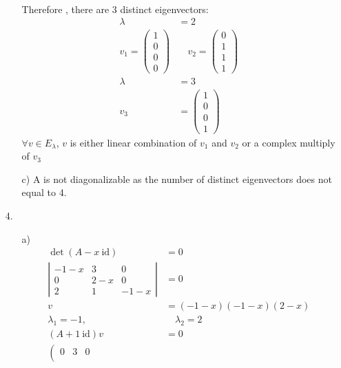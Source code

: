 \documentclass{article}
\begin{document}
\begin{itemize}
\begin{itemize}
\begin{align*}
        \end{align*}
        Therefore , there are 3 distinct eigenvectors:
        \begin{align*}
            \lambda&=2\\
            v_1=\begin{pmatrix}
                1\\0\\0\\0
            \end{pmatrix}
            &\quad v_2=\begin{pmatrix}
                0\\1\\1\\1
            \end{pmatrix}\\
            \lambda&=3\\
            v_3&=\begin{pmatrix}
                1\\0\\0\\1
            \end{pmatrix}
        \end{align*}
        \(\forall v\in E_\lambda\), \(v\) is either linear combination of \(v_1\) and \(v_2\) or a complex multiply of \(v_3\)
        \item [c)]
        A is not diagonalizable as the number of distinct eigenvectors does not equal to 4.
    \end{itemize}
    \item [4.]
    \begin{itemize}
        \item [a)]
        \begin{align*}
            \det(A-x\ \text{id})&=0\\
            \left|\begin{matrix}
                -1-x&3&0\\
                0&2-x&0\\
                2&1&-1-x
            \end{matrix}\right|&=0\\
            v&=(-1-x)(-1-x)(2-x)\\
            \lambda_1=-1,&\quad \lambda_2=2\\
            (A+1\ \text{id})v&=0\\
            \left(\begin{matrix}
                0&3&0\\

\end{matrix}
\end{align*}
\end{itemize}
\end{itemize}
\end{document}
